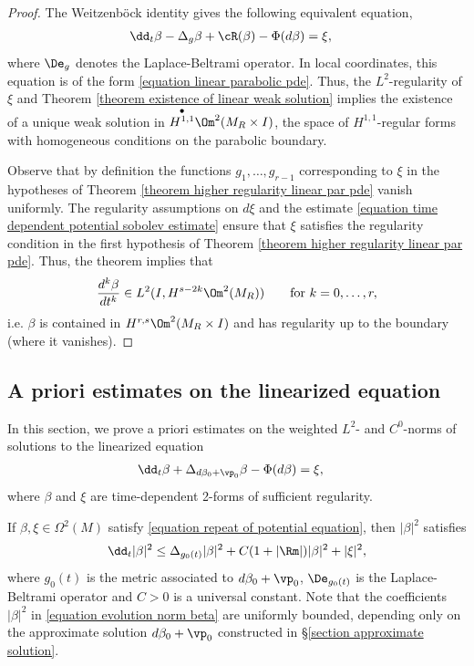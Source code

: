 \documentclass[hidelinks, 12pt, oneside, reqno]{amsart}
\begin{document}
\begin{proof}
The Weitzenb\"ock identity gives the following equivalent equation,
\begin{align*}
    \dd_t \beta - \Delta_g \beta + \cR(\beta) - \Phi(d\beta) &= \xi,  
\end{align*}
where $\De_g$ denotes the Laplace-Beltrami operator. In local coordinates, this equation is of the form \eqref{equation linear parabolic pde}. Thus, the $L^2$-regularity of $\xi$ and Theorem \ref{theorem existence of linear weak solution} implies the existence of a unique weak solution in $\overset{\bullet}{H^{1,1}}\Om^2(M_R \times I)$, the space of $H^{1,1}$-regular forms with homogeneous conditions on the parabolic boundary.

Observe that by definition the functions $g_1, \ldots, g_{r-1}$ corresponding to $\xi$ in the hypotheses of Theorem \ref{theorem higher regularity linear par pde} vanish uniformly. The regularity assumptions on $d\xi$ and the estimate \eqref{equation time dependent potential sobolev estimate} ensure that $\xi$ satisfies the regularity condition in the first hypothesis of Theorem \ref{theorem higher regularity linear par pde}. Thus, the theorem implies that
\[
\frac{d^k\beta}{dt^k} \in L^2(I, H^{s-2k}\Om^2(M_R)) \qquad \text{for } k = 0, \ldots, r,
\]
i.e. $\beta$ is contained in $H^{r,s}\Om^2(M_R \times I)$ and has regularity up to the boundary (where it vanishes).
\end{proof}

\subsection{A priori estimates on the linearized equation} \label{subsection a priori estimates}
In this section, we prove a priori estimates on the weighted $L^2$- and $C^{0}$-norms of solutions to the linearized equation
\begin{align}\label{equation repeat of potential equation}
    \dd_t \beta + \Delta_{d\beta_0 + \vp_0} \beta - \Phi(d\beta) &= \xi, 
\end{align}
where $\beta$ and $\xi$ are time-dependent 2-forms of sufficient regularity. 

\begin{lem}\label{lemma diff ineq for evol of norm}
    If $\beta, \xi \in \Omega^2(M)$ satisfy \eqref{equation repeat of potential equation}, then $|\beta|^2$ satisfies 
    \begin{equation}\label{equation evolution norm beta}
        \dd_t |\beta|^2 \le \Delta_{g_0(t)} |\beta|^2 + C(1 + |\Rm|)|\beta|^2 + |\xi|^2,
    \end{equation}
    where $g_0(t)$ is the metric associated to $d\beta_0 + \vp_0$, $\De_{g_0(t)}$ is the Laplace-Beltrami operator and $C>0$ is a universal constant. Note that the coefficients $|\beta|^2$ in \eqref{equation evolution norm beta} are uniformly bounded, depending only on the approximate solution $d\beta_0 + \vp_0$ constructed in \S \ref{section approximate solution}.
\end{lem}
\end{document}
